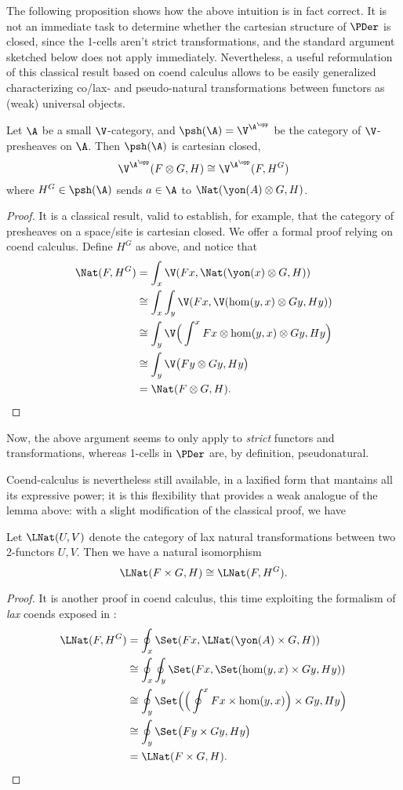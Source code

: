 The following proposition  shows how the above intuition is in fact correct. It is not an immediate task to determine whether the cartesian structure of $\PDer$ is closed, since the 1-cells aren't strict transformations, and the standard argument sketched below does not apply immediately. Nevertheless, a useful reformulation of this classical result based on coend calculus allows to be easily generalized characterizing co/lax- and pseudo-natural transformations between functors as (weak) universal objects.
\begin{lemma}
Let $\A$ be a small $\V$-category, and $\psh(\A)=\V^{\A^\opp}$ be the category of $\V$-presheaves on $\A$. Then $\psh(\A)$ is cartesian closed, \ie
\[
\V^{\A^\opp}(F\otimes G, H)\cong \V^{\A^\opp}(F, H^G)
\]
where $H^G\in \psh(\A)$ sends $a\in\A$ to $\Nat(\yon(A)\otimes G, H)$.
\end{lemma}
\begin{proof}
It is a classical result, valid to establish, for example, that the category of presheaves on a space/site is cartesian closed. We offer a formal proof relying on coend calculus. Define $H^G$ as above, and notice that
\begin{align*}
\Nat(F, H^G) &= \int_x \V(Fx, \Nat(\yon(x)\otimes G, H))\\
&\cong \int_x \int_y \V(Fx, \V(\hom(y,x)\otimes Gy, Hy))\\
&\cong \int_y\V\Big(\int^x Fx \otimes \hom(y,x)\otimes Gy, Hy \Big)\\
&\cong  \int_y\V\big( Fy\otimes Gy, Hy \big)\\
&=\Nat(F\otimes G,H).\qedhere
\end{align*}
\end{proof}
Now, the above argument seems to only apply to \emph{strict} functors and transformations, whereas 1-cells in $\PDer$ are, by definition, pseudonatural.

Coend-calculus is nevertheless still available, in a laxified form that mantains all its expressive power; it is this flexibility that provides a weak analogue of the lemma above: with a slight modification of the classical proof, we have
\begin{proposition}
Let $\LNat(U,V)$ denote the category of lax natural transformations between two 2-functors $U,V$. Then we have a natural isomorphism
\[
\LNat(F\times G,H)\cong \LNat(F, H^G).
\]
\end{proposition}
\begin{proof}
It is another proof in coend calculus, this time exploiting the formalism of \emph{lax} coends exposed in \cite{bozapalides1975fins,bozapalides1977finsgen,bozapalides1980some}:
\begin{align*}
\LNat(F, H^G) &= \oint_x \Set(Fx, \LNat(\yon(A)\times G, H))\\
&\cong \oint_x \oint_y \Set(Fx, \Set(\hom(y,x)\times Gy, Hy))\\
&\cong \oint_y\Set\Big(\Big(\oint^x Fx \times \hom(y,x)\Big)\times Gy, Hy \Big)\\
&\cong  \oint_y\Set\big( Fy\times Gy, Hy \big)\\
&=\LNat(F\times G,H).\qedhere
\end{align*}
\end{proof}
\hrulefill


